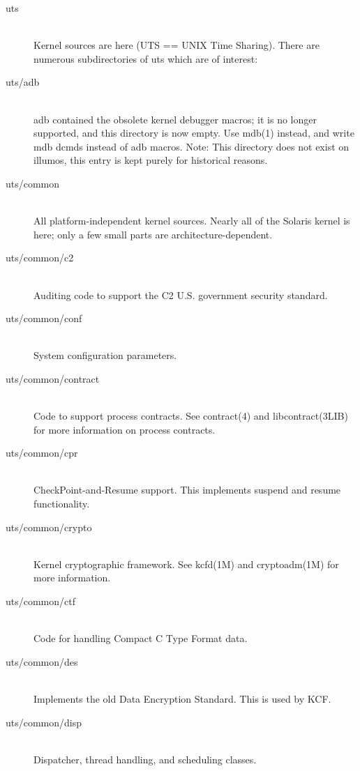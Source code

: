 \documentclass{article}
\begin{document}
\begin{description}
\item[uts] \hfill \\
  Kernel sources are here (UTS == UNIX Time Sharing). There are numerous
  subdirectories of uts which are of interest:

\item[uts/adb] \hfill \\
  adb contained the obsolete kernel debugger macros; it is no longer supported,
  and this directory is now empty. Use mdb(1) instead, and write mdb dcmds
  instead of adb macros. Note: This directory does not exist on illumos, this
  entry is kept purely for historical reasons.

\item[uts/common] \hfill \\
 All platform-independent kernel sources. Nearly all of the Solaris kernel is
 here; only a few small parts are architecture-dependent.

\item[uts/common/c2] \hfill \\
  Auditing code to support the C2 U.S. government security standard.

\item[uts/common/conf] \hfill \\
  System configuration parameters.

\item[uts/common/contract] \hfill \\
  Code to support process contracts. See contract(4) and libcontract(3LIB) for
  more information on process contracts.

\item[uts/common/cpr] \hfill \\
  CheckPoint-and-Resume support. This implements suspend and resume functionality.

\item[uts/common/crypto] \hfill \\
  Kernel cryptographic framework. See kcfd(1M) and cryptoadm(1M) for more information.

\item[uts/common/ctf] \hfill \\
  Code for handling Compact C Type Format data.

\item[uts/common/des] \hfill \\
  Implements the old Data Encryption Standard. This is used by KCF.

\item[uts/common/disp] \hfill \\
  Dispatcher, thread handling, and scheduling classes.


\end{description}
\end{document}
